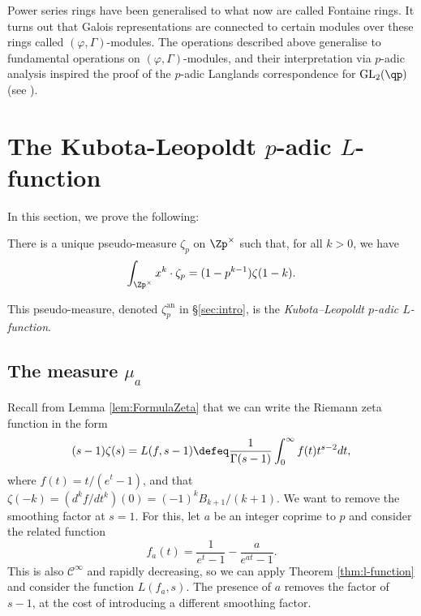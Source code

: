 \documentclass[a4paper,10pt, english, reqno]{smfart}
\numberwithin{equation}{section}
\begin{document}
\begin{remark}
Power series rings have been generalised to what now are called Fontaine rings. It turns out that Galois representations are connected to certain modules over these rings called $(\varphi, \Gamma)$-modules. The operations described above generalise to fundamental operations on $(\varphi,\Gamma)$-modules, and their interpretation via $p$-adic analysis inspired the proof of the $p$-adic Langlands correspondence for $\mathrm{GL}_2(\qp)$ (see \cite{Colm10b}).
\end{remark}







\section{The Kubota-Leopoldt $p$-adic $L$-function}\label{kl}

In this section, we prove the following:

\begin{theorem}\label{thm:kubota leopoldt theorem}
	There is a unique pseudo-measure $\zeta_p$ on $\Zp^\times$ such that, for all $k > 0$, we have
	\[\int_{\Zp^\times}x^k \cdot\zeta_p = (1-p^{k-1})\zeta(1-k).\]
\end{theorem}

This pseudo-measure, denoted $\zeta_p^{\mathrm{an}}$ in \S\ref{sec:intro}, is the \emph{Kubota--Leopoldt $p$-adic $L$-function}.

\subsection{The measure $\mu_a$} \label{KTconst}

Recall from Lemma \ref{lem:FormulaZeta} that we can write the Riemann zeta function in the form
\[(s-1)\zeta(s) = L(f, s-1) \defeq \frac{1}{\Gamma(s-1)}\int_0^\infty f(t)t^{s-2}dt,\]
where $f(t) = t/(e^t-1)$, and that $\zeta(-k) = (d^kf/dt^k)(0) = (-1)^k B_{k+1}/(k+1).$ We want to remove the smoothing factor at $s=1$. For this, let $a$ be an integer coprime to $p$ and consider the related function
\[f_a(t) = \frac{1}{e^t-1} - \frac{a}{e^{at}-1}.\]
This is also $\mathscr{C}^\infty$ and rapidly decreasing, so we can apply Theorem \ref{thm:l-function} and consider the function $L(f_a,s)$. The presence of $a$ removes the factor of $s-1$, at the cost of introducing a different smoothing factor.
\end{document}
